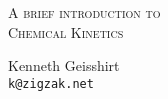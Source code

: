 \thispagestyle{empty}
\begin{center}
  \normalsize \textsc{A brief introduction to}
  \\ \vspace{2cm}
  \LARGE \textsc{Chemical Kinetics}
\end{center}

\vfill


\begin{center}
  Kenneth Geisshirt\\
  \texttt{k@zigzak.net}
\end{center}

